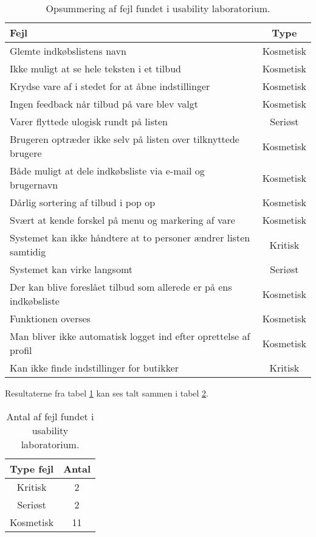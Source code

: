 \begin{table}[H]
\centering
    \begin{tabular}{|l|c|}
	\hline
	Fejl 																& Type  \\ \hline
	
	Glemte indkøbslistens navn      									& Kosmetisk						   \\ \hline
	Ikke muligt at se hele teksten i et tilbud							& Kosmetisk						   \\ \hline	
	Krydse vare af i stedet for at åbne indstillinger					& Kosmetisk						   \\ \hline
	Ingen feedback når tilbud på vare blev valgt						& Kosmetisk						   \\ \hline
	Varer flyttede ulogisk rundt på listen								& Seriøst						   \\ \hline
	Brugeren optræder ikke selv på listen over tilknyttede brugere		& Kosmetisk						   \\ \hline
	Både muligt at dele indkøbsliste via e-mail og brugernavn			& Kosmetisk						   \\ \hline
	Dårlig sortering af tilbud i pop op									& Kosmetisk						   \\ \hline
	Svært at kende forskel på menu og markering af vare					& Kosmetisk						   \\ \hline
	Systemet kan ikke håndtere at to personer ændrer listen samtidig	& Kritisk						   \\ \hline
	Systemet kan virke langsomt											& Seriøst						   \\ \hline
	Der kan blive foreslået tilbud som allerede er på ens indkøbsliste	& Kosmetisk						   \\ \hline
	Funktionen \gaas{Slå alle butikker fra/til} overses					& Kosmetisk						   \\ \hline
	Man bliver ikke automatisk logget ind efter oprettelse af profil	& Kosmetisk						   \\ \hline	
	Kan ikke finde indstillinger for butikker	& Kritisk						   \\ \hline	
	
	
	\end{tabular}
	
\caption{Opsummering af fejl fundet i usability laboratorium.}
\label{tab:opsummeringaffejlfrausabilitylab}

\end{table}

Resultaterne fra tabel \ref{tab:opsummeringaffejlfrausabilitylab} kan ses talt sammen i tabel \ref{tab:antalaffejlfejlfrausabilitylab}.
\begin{table}[H]
\centering
\begin{tabular}{|c|c|}
\hline
Type fejl & Antal\\ \hline
Kritisk   & 2 \\ \hline
Seriøst   & 2 \\ \hline
Kosmetisk & 11 \\ \hline
\end{tabular}
\caption{Antal af fejl fundet i usability laboratorium.}
\label{tab:antalaffejlfejlfrausabilitylab}
\end{table}

